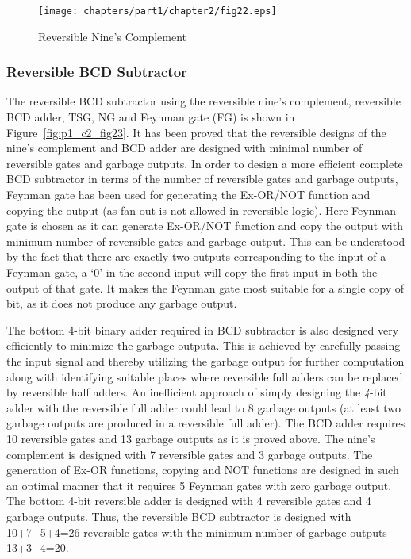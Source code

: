 \begin{figure}[!tbh]
	\centering
	\texttt{[image: chapters/part1/chapter2/fig22.eps]}
	\caption{Reversible Nine's Complement}
	\label{fig:p1_c2_fig22}
\end{figure}

\subsubsection{Reversible BCD Subtractor}
The reversible BCD subtractor using the reversible nine's complement, reversible BCD adder, TSG, NG  and Feynman gate (FG) is shown in Figure~\ref{fig:p1_c2_fig23}. It has been proved that the reversible designs of the nine's complement and BCD adder are designed with minimal number of reversible gates and garbage outputs. In order to design a more efficient complete BCD subtractor in terms of the number of reversible gates and garbage outputs, Feynman gate has been used for generating the Ex-OR/NOT function and copying the output (as fan-out is not allowed in reversible logic). Here Feynman gate is chosen as it can generate Ex-OR/NOT function and copy the output with minimum number of reversible gates and garbage output. This can be understood by the fact that there are exactly two outputs corresponding to the input of a Feynman gate, a `0' in the second input will copy the first input in both the output of that gate. It makes the Feynman gate most suitable for a single copy of bit, as it does not produce any garbage output.


The bottom {4}-bit binary adder required in BCD subtractor is also designed very efficiently to minimize the garbage outputa. This is achieved by carefully passing the input signal and thereby utilizing the garbage output for further computation along with identifying suitable places where reversible full adders can be replaced by reversible half adders. An inefficient approach of simply designing the \textit{4}-bit adder with the reversible full adder could lead to 8 garbage outputs (at least two garbage outputs are produced in a reversible full adder). The BCD adder requires 10 reversible gates and 13 garbage outputs as it is proved above. The nine's complement is designed with 7 reversible gates and 3 garbage outputs. The generation of Ex-OR functions, copying and NOT functions are designed in such an optimal manner that it requires 5 Feynman gates with zero garbage output. The bottom {4}-bit reversible adder is designed with 4 reversible gates and 4 garbage outputs. Thus, the reversible BCD subtractor is designed with 10+7+5+4=26 reversible gates with the minimum number of garbage outputs 13+3+4=20.

